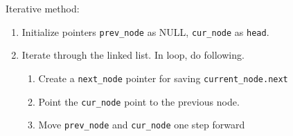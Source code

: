 \documentclass[a4paper,11pt]{book}
\begin{document}
\noindent Iterative method:

\begin{enumerate}
    \item Initialize pointers \lstinline{prev_node} as NULL, \lstinline{cur_node} as \lstinline{head}.
    \item Iterate through the linked list. In loop, do following.
    \begin{enumerate}
        \item Create a \lstinline{next_node} pointer for saving \lstinline{current_node.next}
        \item Point the \lstinline{cur_node} point to the previous node.
        \item Move \lstinline{prev_node} and \lstinline{cur_node} one step forward 
    \end{enumerate}
\end{enumerate}
\end{document}
